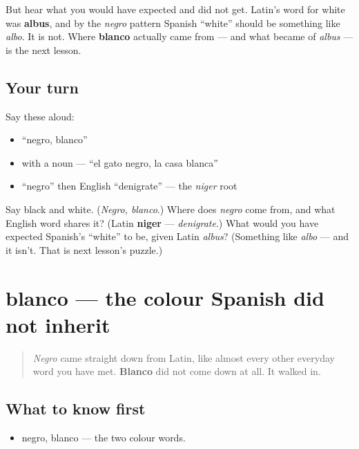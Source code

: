 But hear what you would have expected and did not get. Latin's word for white was \textbf{albus}, and by the \emph{negro} pattern Spanish \textquotedblleft{}white\textquotedblright{} should be something like \emph{albo}. It is not. Where \textbf{blanco} actually came from — and what became of \emph{albus} — is the next lesson.

\subsection*{Your turn}
Say these aloud:

\begin{itemize}
\raggedright
  \item \textquotedblleft{}negro, blanco\textquotedblright{}
  \item with a noun — \textquotedblleft{}el gato negro, la casa blanca\textquotedblright{}
  \item \textquotedblleft{}negro\textquotedblright{} then English \textquotedblleft{}denigrate\textquotedblright{} — the \emph{niger} root
\end{itemize}

\begin{tcolorbox}[breakable,colback=teal!4,colframe=teal!35!black,title={Before you move on}]
Say black and white. (\emph{Negro, blanco}.) Where does \emph{negro} come from, and what English word shares it? (Latin \textbf{niger} — \emph{denigrate}.) What would you have expected Spanish's \textquotedblleft{}white\textquotedblright{} to be, given Latin \emph{albus}? (Something like \emph{albo} — and it isn't. That is next lesson's puzzle.)
\end{tcolorbox}
\section[blanco from \emph{blank}]{blanco — the colour Spanish did not inherit}

\label{lesson:ES-C22-blanco-germanico}



\begin{quote}
\emph{Negro} came straight down from Latin, like almost every other everyday word you have met. \textbf{Blanco} did not come down at all. It walked in.
\end{quote}

\subsection*{What to know first}
\begin{itemize}
\raggedright
  \item negro, blanco — the two colour words.
\end{itemize}

